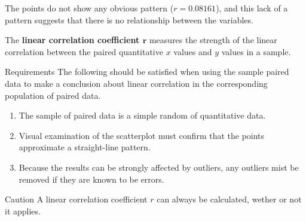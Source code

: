 \documentclass{beamer}
\begin{document}
\begin{frame}
\begin{example}
\begin{center}
\end{center}\pause
The points do not show any obvious pattern ($r=0.08161$), and this lack of a pattern suggests that there is no relationship between the variables.
\end{example}
\end{frame}

\begin{frame}
\begin{definition}
The \textbf{linear correlation coefficient $\boldsymbol{r}$} measures the strength of the linear correlation between the paired quantitative $x$ values and $y$ values in a sample.
\end{definition}\pause

\begin{block}{Requirements}
The following should be satisfied when using the sample paired data to make a conclusion about linear correlation in the corresponding population of paired data.
\begin{enumerate}
\item The sample of paired data is a simple random of quantitative data.\pause
\item Visual examination of the scatterplot must confirm that the points approximate a straight-line pattern.\pause
\item Because the results can be strongly affected by outliers, any outliers mist be removed if they are known to be errors.
\end{enumerate}
\end{block}

\begin{block}{Caution}\small
A linear correlation coefficient $r$ can always be calculated, wether or not it applies.
\end{block}
\end{frame}
\end{document}
